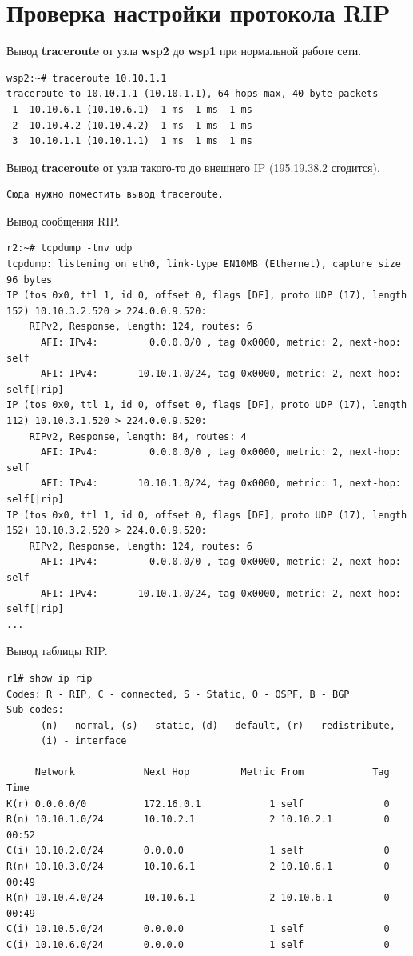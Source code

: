 \documentclass[a4paper,12pt]{article}
\begin{document}
\section{Проверка настройки протокола RIP}

Вывод \textbf{traceroute} от узла \textbf{wsp2} до \textbf{wsp1} при нормальной работе сети.

\begin{Verbatim}
wsp2:~# traceroute 10.10.1.1
traceroute to 10.10.1.1 (10.10.1.1), 64 hops max, 40 byte packets
 1  10.10.6.1 (10.10.6.1)  1 ms  1 ms  1 ms
 2  10.10.4.2 (10.10.4.2)  1 ms  1 ms  1 ms
 3  10.10.1.1 (10.10.1.1)  1 ms  1 ms  1 ms
\end{Verbatim}

Вывод \textbf{traceroute} от узла такого-то до внешнего IP (195.19.38.2 сгодится).

\begin{Verbatim}
Сюда нужно поместить вывод traceroute.
\end{Verbatim}

Вывод сообщения RIP.

\begin{Verbatim}
r2:~# tcpdump -tnv udp
tcpdump: listening on eth0, link-type EN10MB (Ethernet), capture size 96 bytes
IP (tos 0x0, ttl 1, id 0, offset 0, flags [DF], proto UDP (17), length 152) 10.10.3.2.520 > 224.0.0.9.520: 
	RIPv2, Response, length: 124, routes: 6
	  AFI: IPv4:         0.0.0.0/0 , tag 0x0000, metric: 2, next-hop: self
	  AFI: IPv4:       10.10.1.0/24, tag 0x0000, metric: 2, next-hop: self[|rip]
IP (tos 0x0, ttl 1, id 0, offset 0, flags [DF], proto UDP (17), length 112) 10.10.3.1.520 > 224.0.0.9.520: 
	RIPv2, Response, length: 84, routes: 4
	  AFI: IPv4:         0.0.0.0/0 , tag 0x0000, metric: 2, next-hop: self
	  AFI: IPv4:       10.10.1.0/24, tag 0x0000, metric: 1, next-hop: self[|rip]
IP (tos 0x0, ttl 1, id 0, offset 0, flags [DF], proto UDP (17), length 152) 10.10.3.2.520 > 224.0.0.9.520: 
	RIPv2, Response, length: 124, routes: 6
	  AFI: IPv4:         0.0.0.0/0 , tag 0x0000, metric: 2, next-hop: self
	  AFI: IPv4:       10.10.1.0/24, tag 0x0000, metric: 2, next-hop: self[|rip]
...
\end{Verbatim}

Вывод таблицы RIP.

\begin{Verbatim}
r1# show ip rip
Codes: R - RIP, C - connected, S - Static, O - OSPF, B - BGP
Sub-codes:
      (n) - normal, (s) - static, (d) - default, (r) - redistribute,
      (i) - interface

     Network            Next Hop         Metric From            Tag Time
K(r) 0.0.0.0/0          172.16.0.1            1 self              0
R(n) 10.10.1.0/24       10.10.2.1             2 10.10.2.1         0 00:52
C(i) 10.10.2.0/24       0.0.0.0               1 self              0
R(n) 10.10.3.0/24       10.10.6.1             2 10.10.6.1         0 00:49
R(n) 10.10.4.0/24       10.10.6.1             2 10.10.6.1         0 00:49
C(i) 10.10.5.0/24       0.0.0.0               1 self              0
C(i) 10.10.6.0/24       0.0.0.0               1 self              0
\end{Verbatim}
\end{document}
